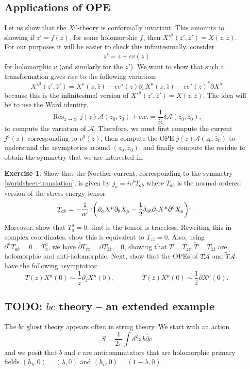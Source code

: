 \documentclass{report}
\theoremstyle{plain}
\theoremstyle{definition}
\newtheorem{exercise}{Exercise}[section]
\theoremstyle{remark}
\newcommand{\FR}[2]{\frac{#1}{#2}}
\newcommand{\ms}{\mathscr}
\newcommand{\di}{\partial}
\newcommand{\delbar}{\bar\partial}
\newcommand{\NO}[1]{\vcentcolon\mathrel{#1}\vcentcolon\,}
\DeclareMathOperator{\Res}{Res}
\begin{document}
\subsection{Applications of OPE}
Let us show that the $X^\mu$-theory is conformally invariant. This amounts
to showing if $z'=f(z)$, for some holomorphic $f$, then $X'^\mu(z',\bar z')
= X(z,\bar z)$. For our purposes it will be easier to check this
infinitesimally. consider
\begin{align} z' = z+\epsilon v(z)
\label{worldsheet-translation}
\end{align}
for holomorphic $v$ (and similarly for the $\bar z'$).
We want to show that such a transformation gives rise to the following variation:
\[X'^\mu(z',\bar z')=X^\mu(z,\bar z)-\epsilon v^a(z)\di_a X^\mu(z,\bar
z) - \epsilon v^a(z)^* \bar\di X^\mu\]
because this is the infinitesimal version of $X'^\mu(z',\bar z')
= X(z,\bar z)$. The idea will be to use the Ward identity,
\[ \Res_{z \to z_0} j(z) \ms A(z_0,\bar z_0) + c.c. =
\FR{1}{i\epsilon}\delta \ms A(z_0,\bar z_0),\] to compute the variation of
$\ms A$. Therefore, we must first compute the current $j^a(z)$
corresponding to $v^a(z)$, then compute the OPE $j(z)\ms A(z_0,\bar z_0)$
to understand the asymptotics around $(z_0,\bar z_0)$, and finally compute
the residue to obtain the symmetry that we are interested in.

\begin{exercise} Show that the Noether current, corresponding to the
symmetry \eqref{worldsheet-translation}, is given by $j_a = iv^b T_{ab}$
where $T_{ab}$ is the normal ordered version of the stress-energy
tensor \[T_{ab} = -\FR{1}{\alpha'} \NO{ \left( \di_a X^\mu\di_b
X_\mu - \FR{1}{2}\delta_{ab}\di_c X^\mu\di^c X_\mu \right)}.\]
Moreover, show that $T_a^a = 0$, that is the tensor is traceless. Rewriting
this in complex coordinates, show this is equivalent to $T_{z\bar z} = 0$.
Also, using $\di^aT_{ab} = 0 = T^a_a$, we have $\bar\di T_{zz} = \di
T_{\bar z\bar z} = 0$, showing that $T = T_{zz}, \tilde T = T_{\bar z\bar
z}$ are holomorphic and anti-holomorphic. Next, show that the OPEs of $T\ms
A$ and $\tilde T\ms A$ have the following asymptotics:
\[ T(z) X^\mu(0) \sim \FR{1}{z} \di_zX^\mu(0), \qquad\qquad
\tilde T(\bar z)X^\mu(0) \sim \FR{1}{\bar z}\bar\di X^\mu(0).\]
\end{exercise}
\subsection{TODO: $bc$ theory -- an extended example}
The $bc$ ghost theory appears often in string theory.
We start with an action
\[ S = \FR{1}{2\pi} \int d^2 z\, b\delbar c\]
and we posit that $b$ and $c$ are anticommutators that are holomorphic
primary fields $(h_b,0) = (\lambda,0)$ and $(h_c,0) = (1-\lambda,0)$.
\end{document}

